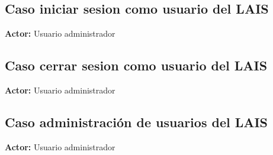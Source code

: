 \documentclass[10pt,letterpaper]{article}
\begin{document}
\subsection{Caso iniciar sesion como usuario del LAIS}
\textbf{Actor:} Usuario administrador

\subsection{Caso cerrar sesion como usuario del LAIS}
\textbf{Actor:} Usuario administrador

\subsection{Caso administración de usuarios del LAIS}
\textbf{Actor:} Usuario administrador

\end{document}
